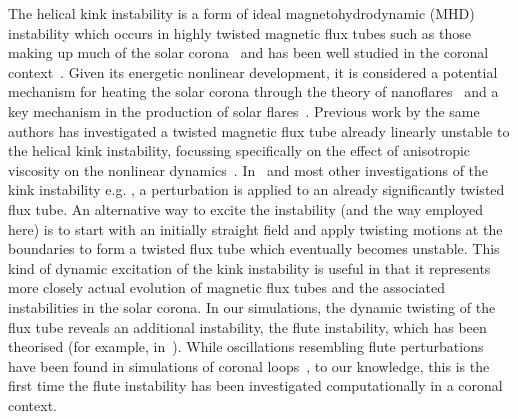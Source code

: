 \documentclass[fleqn,usenatbib]{mnras}
\newcommand{\rs}[2]{{#2}}
\newcommand{\jq}[2]{{#2}}
\begin{document}
The helical kink instability is a form of ideal magnetohydrodynamic
(MHD) instability which occurs in highly twisted magnetic flux tubes
such as those making up much of the solar
corona~\citep{realeCoronalLoopsObservations2014} and has been well
studied in the coronal
context~\citep{hoodKinkInstabilitySolar1979,hoodCoronalHeatingMagnetic2009,browningSolarCoronalHeating2003b,barefordShockHeatingNumerical2015,quinnEffectAnisotropicViscosity2020}. Given
its energetic nonlinear development, it is considered a potential
mechanism for heating the solar corona through the theory of
nanoflares~\citep{klimchukSolvingCoronalHeating2006,browningMechanismsSolarCoronal1991}
and a key mechanism in the production of solar
flares~\citep{hoodKinkInstabilitySolar1979}. Previous work by the same
authors has investigated a twisted magnetic flux tube already linearly
unstable to the helical kink instability, \rs{investigating particularly}{focussing specifically on}
the effect of anisotropic viscosity on the nonlinear
dynamics~\citep{quinnEffectAnisotropicViscosity2020}. In~\citep{quinnEffectAnisotropicViscosity2020}
and most other investigations of the kink instability
\rs{}{e.g. \citep{hoodCoronalHeatingMagnetic2009}}, a perturbation 
is applied to an already significantly twisted flux tube. An
alternative way to excite the instability (and the way employed here)
is to start with an initially straight field and apply twisting
motions at the boundaries to form a twisted flux tube which eventually
becomes unstable. This kind of dynamic excitation of the kink
instability is useful in that it represents more closely \rs{the real
development of a magnetic flux tube and associated}{actual evolution
  of magnetic flux tubes and the associated} instabilities in 
the solar corona. \rs{The}{In our simulations, the}
dynamic twisting of the flux tube reveals an additional instability,
the \rs{fluting}{flute} instability, which has been theorised (for example,
in~\citep{priestMagnetohydrodynamicsSun2013}). \jq{}{While oscillations resembling flute perturbations have been found in simulations of coronal loops~\citep{terradasEffectMagneticTwist2018}, to our knowledge, this is the first time the flute instability has been investigated computationally in a coronal context.}
\end{document}
